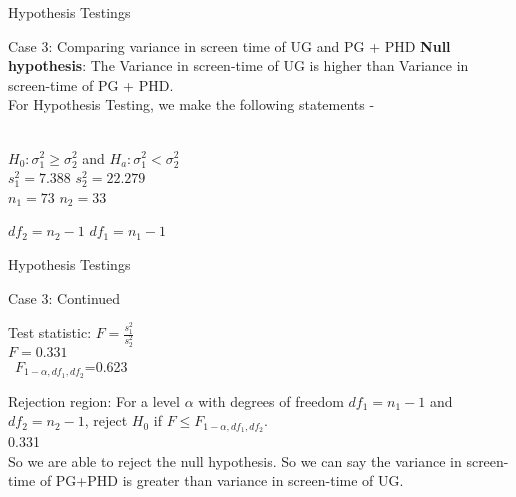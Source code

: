 \documentclass{beamer}
\begin{document}
\begin{frame}{Hypothesis Testings}
\begin{block}{Case 3: Comparing variance in screen time of UG and PG + PHD}
\textbf{Null hypothesis}: The Variance in screen-time of UG is higher than Variance in screen-time of PG + PHD.\\



 For Hypothesis Testing, we make the following statements -

\par
\begin{center}
    \\
   $H_{0}: \sigma_{1}^{2} \geq \sigma_{2}^{2}$  and  $H_{a}: \sigma_{1}^{2} < \sigma_{2}^{2}$ \\
  
   $s_{1}^{2}=7.388$ \quad   $s_{2}^{2}= 22.279$\\
          $n_1 = 73$ \quad
    $n_2 = 33$  
    
    $df_{2}=n_{2}-1$  $df_{1}=n_{1}-1$  \\
   
\end{center}
\end{block}
\end{frame}

\begin{frame}{Hypothesis Testings}
\begin{block}{Case 3: Continued}
\begin{center}
         Test statistic: $F=\frac{s_{1}^{2}}{s_{2}^{2}}$\\
     $F=0.331$\\\
     $F_{1-\alpha, df_{1}, df_{2}}$=0.623\\
     \end{center}
 Rejection region: For a level $\alpha$ with degrees of freedom $df_{1}=n_{1}-1$ and $df_{2}=n_{2}-1$, reject $H_{0}$ if $F \leq F_{1-\alpha, df_{1}, df_{2}}$.\\
0.331 \leq 0.623\\
So we are able to reject the null hypothesis. So we can say the variance in screen-time of PG+PHD is greater than variance in screen-time of UG.\\
\end{block}
\end{frame}
\end{document}
